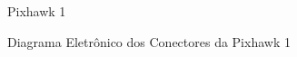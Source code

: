 %
\begin{figure}[H]
	\centering
	\caption{Pixhawk 1}
	\fontsize{9pt}{12pt}\selectfont
	\def\svgwidth{13cm}
	
	\label{fig:pixhawk}
\end{figure}

%
\begin{figure}[H]
	\centering
	\caption{Diagrama Eletrônico dos Conectores da Pixhawk 1}
	\fontsize{9pt}{12pt}\selectfont
	\def\svgwidth{13cm}
	
	\label{fig:pixhawkCirc}
\end{figure}

